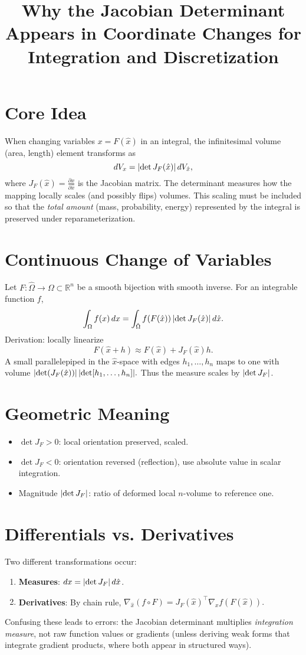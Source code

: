 \documentclass[11pt]{article}
\title{Why the Jacobian Determinant Appears in Coordinate Changes for Integration and Discretization}
\author{}
\date{}
\begin{document}
\maketitle

\section{Core Idea}
When changing variables \( x = F(\hat x) \) in an integral, the infinitesimal volume (area, length) element transforms as
\[
dV_x = \abs{\det J_F(\hat x)}\, dV_{\hat x},
\]
where \( J_F(\hat x) = \frac{\partial x}{\partial \hat x} \) is the Jacobian matrix. The determinant measures how the mapping locally scales (and possibly flips) volumes. This scaling must be included so that the \emph{total amount} (mass, probability, energy) represented by the integral is preserved under reparameterization.

\section{Continuous Change of Variables}
Let \( F : \hat\Omega \to \Omega \subset \mathbb{R}^n\) be a smooth bijection with smooth inverse. For an integrable function \( f \),
\[
\int_{\Omega} f(x)\, d x = \int_{\hat \Omega} f(F(\hat x))\, \abs{\det J_F(\hat x)}\, d\hat x.
\]
Derivation: locally linearize
\[
F(\hat x + h) \approx F(\hat x) + J_F(\hat x) h.
\]
A small parallelepiped in the \(\hat x\)-space with edges \(h_1,\dots,h_n\) maps to one with volume
\(
\abs{\det(J_F(\hat x))}\, \abs{\det[h_1,\dots,h_n]}.
\)
Thus the measure scales by \(\abs{\det J_F}\).

\section{Geometric Meaning}
\begin{itemize}
  \item \( \det J_F > 0 \): local orientation preserved, scaled.
  \item \( \det J_F < 0 \): orientation reversed (reflection), use absolute value in scalar integration.
  \item Magnitude \( \abs{\det J_F} \): ratio of deformed local $n$-volume to reference one.
\end{itemize}

\section{Differentials vs. Derivatives}
Two different transformations occur:
\begin{enumerate}
  \item \textbf{Measures}: \( d x = \abs{\det J_F}\, d\hat x \).
  \item \textbf{Derivatives}: By chain rule,
  \(
  \nabla_{\hat x}(f\circ F) = J_F{(\hat x)}^{\top} \nabla_x f(F(\hat x)).
  \)
\end{enumerate}
Confusing these leads to errors: the Jacobian determinant multiplies \emph{integration measure}, not raw function values or gradients (unless deriving weak forms that integrate gradient products, where both appear in structured ways).
\end{document}
